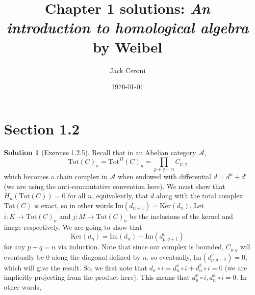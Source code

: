 \documentclass[aps,pra,showpacs,notitlepage,onecolumn,superscriptaddress,nofootinbib,oneside,10pt]{article}
\theoremstyle{definition}
\newtheorem{solution}{Solution}[section]
\begin{document}
\title{Chapter 1 solutions: \emph{An introduction to homological algebra} by Weibel}
\author{Jack Ceroni}
\date{\today}
\maketitle

\tableofcontents

\section{Section 1.2}

\begin{solution}[Exercise 1.2.5]
  Recall that in an Abelian category $\mathcal{A}$,
  \begin{equation}
    \text{Tot}(C)_n = \text{Tot}^{\Pi}(C)_n = \prod_{p + q = n} C_{p, q}
    \end{equation}
  which becomes a chain complex in $\mathcal{A}$ when endowed with differential $d = d^h + d^v$ (we are using the anti-commutative convention here).
  We must show that $H_n(\text{Tot}(C)) = 0$ for all $n$, equivalently, that $d$ along with the total complex $\text{Tot}(C)$ is exact, so in other words $\text{Im}(d_{n+1}) = \text{Ker}(d_{n})$.
  Let $i : K \rightarrow \text{Tot}(C)_n$ and $j : M \rightarrow \text{Tot}(C)_n$ be the inclusions of the kernel and image respectively. We are going to show that
  \begin{equation}
    \text{Ker}(d_n) = \text{Im}(d_n) + \text{Im}(d^v_{p, q + 1})
    \end{equation}
  for any $p + q = n$ via induction. Note that since our complex is bounded, $C_{p, q}$ will eventually be $0$ along the diagonal defined by $n$, so eventually, $\text{Im}(d^v_{p, q + 1}) = 0$,
  which will give the result. So, we first note that $d_n \circ i = d^v_n \circ i + d^h_n \circ i = 0$ (we are implicitly projecting from the product here). This means that $d^v_n \circ i, d^h_n \circ i = 0$. In other words, 
\end{solution}


\end{document}
